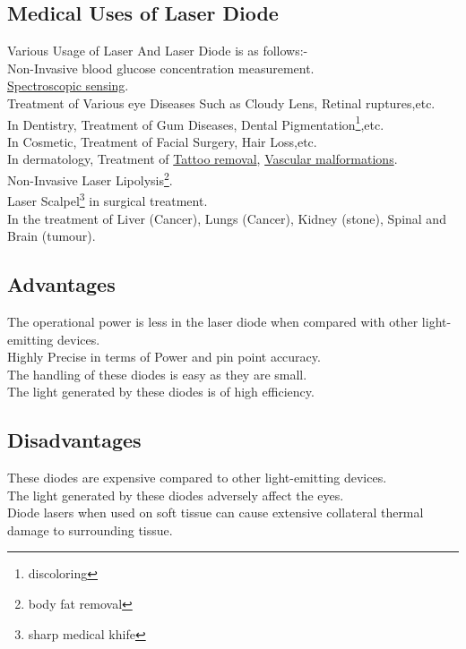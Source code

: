 \documentclass[12pt]{article}
\begin{document}
  \subsection{Medical Uses of Laser Diode}
 
  Various Usage of Laser And Laser Diode is as follows:-\hspace{2mm} \cite{https://doi.org/10.1002/lpor.201200051} \\
   Non-Invasive blood glucose concentration measurement.\\
   \href{https://en.wikipedia.org/wiki/Tunable_diode_laser_absorption_spectroscopy}{Spectroscopic sensing}.\\
   Treatment of Various eye Diseases Such as Cloudy Lens, Retinal ruptures,etc.\\
   In Dentistry, Treatment of Gum Diseases, Dental Pigmentation\footnote{discoloring},etc.\\
   In Cosmetic, Treatment of Facial Surgery, Hair Loss,etc.\\
   In dermatology, Treatment of \href{https://en.wikipedia.org/wiki/Vascular_malformation}{Tattoo removal}, \href{https://en.wikipedia.org/wiki/Vascular_malformation}{Vascular malformations}.\\
   Non-Invasive Laser Lipolysis\footnote{body fat removal}.\\
   Laser Scalpel\footnote{sharp medical khife} in surgical treatment.\\
   In the treatment of Liver (Cancer), Lungs (Cancer), Kidney (stone), Spinal and Brain (tumour).
  
  \subsection{Advantages}
 
    The operational power is less in the laser diode when compared with other light-emitting devices.\\
    Highly Precise in terms of Power and pin point accuracy.\\
    The handling of these diodes is easy as they are small.\\
    The light generated by these diodes is of high efficiency.
   \subsection{Disadvantages}
  
    These diodes are expensive compared to other light-emitting devices.\\
    The light generated by these diodes adversely affect the eyes.\\
    Diode lasers when used on soft tissue can cause extensive collateral thermal damage to surrounding tissue.
\clearpage
{}
\printbibliography
\end{document}
